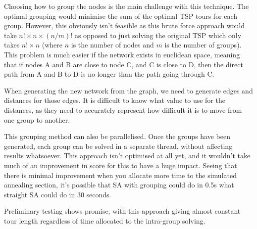 \documentclass[a4paper, 11pt,table]{article}
\begin{document}
Choosing how to group the nodes is the main challenge with this technique. The optimal grouping would minimise the sum of the optimal TSP tours for each group. However, this obviously isn't feasible as this brute force approach would take $n! \times n \times (n/m)!$ as opposed to just solving the original TSP which only takes $n! \times n$ (where $n$ is the number of nodes and $m$ is the number of groups). This problem is much easier if the network exists in euclidean space, meaning that if nodes A and B are close to node C, and C is close to D, then the direct path from A and B to D is no longer than the path going through C.

When generating the new network from the graph, we need to generate edges and distances for those edges. It is difficult to know what value to use for the distances, as they need to accurately represent how difficult it is to move from one group to another.

This grouping method can also be parallelised. Once the groups have been generated, each group can be solved in a separate thread, without affecting results whatsoever. This approach isn't optimised at all yet, and it wouldn't take much of an improvement in score for this to have a huge impact. Seeing that there is minimal improvement when you allocate more time to the simulated annealing section, it's possible that SA with grouping could do in 0.5s what straight SA could do in 30 seconds.

Preliminary testing shows promise, with this approach giving almost constant tour length regardless of time allocated to the intra-group solving.

\begin{figure}
	\begin{center}
	\end{center}
\end{figure}
\end{document}
